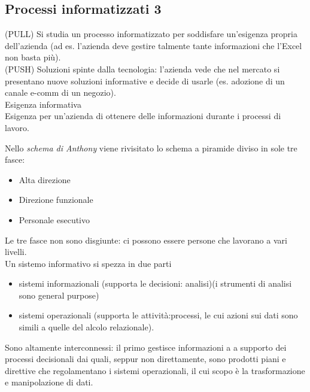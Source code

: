 \subsection{Processi informatizzati 3}
\label{sub:Processi informatizzati 3}
(PULL) Si studia un processo informatizzato per soddisfare un'esigenza propria dell'azienda
(ad es. l'azienda deve gestire talmente tante informazioni che l'Excel non basta pi\`u).\\
(PUSH) Soluzioni spinte dalla tecnologia: l'azienda vede che nel mercato si
presentano nuove soluzioni informative e decide di usarle (es. adozione di un canale e-comm
di un negozio).\\
Esigenza informativa\\
Esigenza per un'azienda di ottenere delle informazioni durante i processi di lavoro.

Nello \textit{schema di Anthony} viene rivisitato lo schema a piramide diviso in sole tre fasce:
\begin{itemize}
  \item Alta direzione
  \item Direzione funzionale
  \item Personale esecutivo
\end{itemize}
Le tre fasce non sono disgiunte: ci possono essere persone che lavorano a vari livelli.\\
Un sistemo informativo si spezza in due parti
\begin{itemize}
  \item sistemi informazionali (supporta le decisioni: analisi)(i strumenti di analisi
sono general purpose)
  \item sistemi operazionali (supporta le attivit\`a:processi, le cui azioni sui dati sono
  simili a quelle del alcolo relazionale).
\end{itemize}


Sono altamente interconnessi: il primo gestisce informazioni a a supporto
dei processi decisionali dai quali, seppur non direttamente, sono prodotti piani
e direttive che regolamentano i sistemi operazionali, il cui scopo \`e la trasformazione
e manipolazione di dati.


